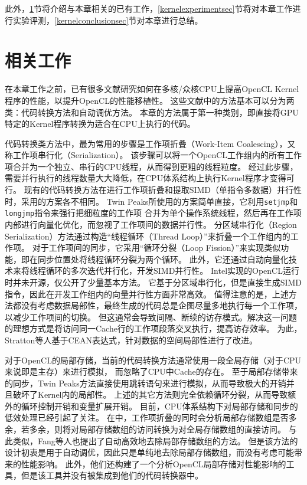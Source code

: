 此外，\ref{kernelrelatedworksec}节将介绍与本章相关的已有工作，\ref{kernelexperimentsec}节将对本章工作进行实验评测，\ref{kernelconclusionsec}节对本章进行总结。

\section{相关工作}
\label{kernelrelatedworksec}
在本章工作之前，已有很多文献研究如何在多核/众核CPU上提高OpenCL Kernel程序的性能，以提升OpenCL的性能移植性。
这些文献中的方法基本可以分为两类：代码转换方法和自动调优方法。
本章的方法属于第一种类别，即直接将GPU特定的Kernel程序转换为适合在CPU上执行的代码。

代码转换类方法中，最为常用的步骤是工作项折叠（Work-Item Coalescing），又称工作项串行化（Serialization）。
该步骤可以将一个OpenCL工作组内的所有工作项合并为一个独立、串行的CPU线程，从而得到更粗的线程粒度。
经过此步骤，需要并行执行的线程数量大大降低，在CPU体系结构上执行Kernel程序才变得可行。
现有的代码转换方法在进行工作项折叠和提取SIMD（单指令多数据）并行性时，采用的方案各不相同。
Twin Peaks所使用的方案简单直接，它利用{\tt setjmp}和{\tt longjmp}指令来强行把细粒度的工作项
合并为单个操作系统线程，然后再在工作项内部进行向量化优化，而忽视了工作项间的数据并行性。
分区域串行化（Region Serialization）方法通过构造``线程循环（Thread Loop）''来折叠一个工作组内的工作项。
对于工作项间的同步，它采用``循环分裂（Loop Fission）''来实现类似功能，即在同步位置处将线程循环分裂为两个循环。
此外，它还通过自动向量化技术来将线程循环的多次迭代并行化，开发SIMD并行性。
Intel实现的OpenCL运行时并未开源，仅公开了少量基本方法。
它基于分区域串行化，但是直接生成SIMD指令，因此在开发工作组内的向量并行性方面非常高效。
值得注意的是，上述方法都没有考虑数据局部性，最终生成的代码总是企图尽量多地执行每一个工作项，以减少工作项间的切换。
但这通常会导致间隔、断续的访存模式。解决这一问题的理想方式是将访问同一Cache行的工作项段落交叉执行，提高访存效率。
为此，Stratton等人基于CEAN表达式，针对数据的空间局部性进行了改进。


对于OpenCL的局部存储，当前的代码转换方法通常使用一段全局存储（对于CPU来说即是主存）来进行模拟，
而忽略了CPU中Cache的存在。
至于局部存储带来的同步，Twin Peaks方法直接使用跳转语句来进行模拟，从而导致极大的开销并且破坏了Kernel内的局部性。
上述的其它方法则完全依赖循环分裂，从而导致额外的循环控制开销和变量扩展开销。
目前，CPU体系结构下对局部存储和同步的低效处理已经引起了关注。
在\cite{europar14}中，工作项折叠的同时会分析局部存储数组是否多余，若多余，则将对局部存储数组的访问转换为对全局存储数组的直接访问。
与此类似，Fang等人也提出了自动高效地去除局部存储数组的方法。
但是该方法的设计初衷是用于自动调优，因此只是单纯地去除局部存储数组，而没有考虑可能带来的性能影响。
此外，他们还构建了一个分析OpenCL局部存储对性能影响的工具，但是该工具并没有被集成到他们的代码转换器中。


